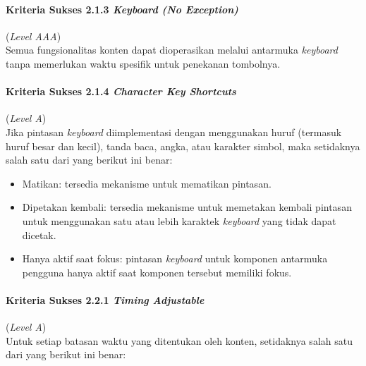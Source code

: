 \paragraph{Kriteria Sukses 2.1.3 \textit{Keyboard (No Exception)}}
\label{subsec:kriteria_2.1.3}
(\textit{Level AAA}) \\

Semua fungsionalitas konten dapat dioperasikan melalui antarmuka \textit{keyboard} tanpa memerlukan waktu spesifik untuk penekanan tombolnya.

\paragraph{Kriteria Sukses 2.1.4 \textit{Character Key Shortcuts}}
\label{subsec:kriteria_2.1.4}
(\textit{Level A}) \\

Jika pintasan \textit{keyboard} diimplementasi dengan menggunakan huruf (termasuk huruf besar dan kecil), tanda baca, angka, atau karakter simbol, maka setidaknya salah satu dari yang berikut ini benar:

\begin{itemize}
	\item Matikan: tersedia mekanisme untuk mematikan pintasan.
	\item Dipetakan kembali: tersedia mekanisme untuk memetakan kembali pintasan untuk menggunakan satu atau lebih karaktek \textit{keyboard} yang tidak dapat dicetak.
	\item Hanya aktif saat fokus: pintasan \textit{keyboard} untuk komponen antarmuka pengguna hanya aktif saat komponen tersebut memiliki fokus.
\end{itemize}

\paragraph{Kriteria Sukses 2.2.1 \textit{Timing Adjustable}}
\label{subsec:kriteria_2.2.1}
(\textit{Level A}) \\

Untuk setiap batasan waktu yang ditentukan oleh konten, setidaknya salah satu dari yang berikut ini benar:

